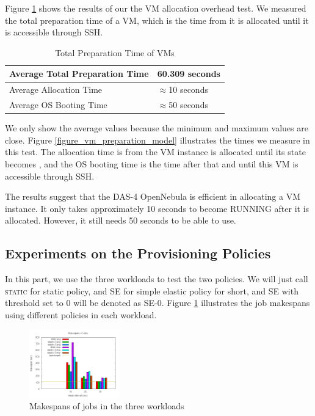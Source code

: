Figure \ref{table_vm_preparation} shows the results of our the VM allocation
overhead test. We measured the total preparation time of a VM, which is the
time from it is allocated until it is accessible through \textsc{SSH}.

\begin{table}
\caption{Total Preparation Time of VMs}
\label{table_vm_preparation}
\centering
\begin{tabular}{|l|l|}
\hline
Average Total Preparation Time & 60.309 seconds \\
\hline
Average Allocation Time & $\approx$10 seconds \\
\hline
Average OS Booting Time & $\approx$50 seconds \\
\hline
\end{tabular}
\end{table}

We only show the average values because the minimum and maximum values
are close. Figure \ref{figure_vm_preparation_model} illustrates the times
we measure in this test. The allocation time is from the VM instance is
allocated until its state becomes \staterunning, and the OS booting time is
the time after that and until this VM is accessible through \textsc{SSH}.

The results suggest that the DAS-4 OpenNebula is efficient in
allocating a VM instance. It only takes approximately 10 seconds to
become RUNNING after it is allocated. However, it still needs 50
seconds to be able to use.


\subsection{Experiments on the Provisioning Policies}
In this part, we use the three workloads to test the two policies. We
will just call \textsc{static} for static policy, and \textsc{SE} for
simple elastic policy for short, and \textsc{SE} with threshold set to
0 will be denoted as \textsc{SE-0}. Figure \ref{figure_jobmakespan}
illustrates the job makespans using different policies in each workload.

\begin{figure}[!t]
\centering
\includegraphics[width=0.35\textwidth]{pictures/all-makespans.png}
\caption{Makespans of jobs in the three workloads}
\label{figure_jobmakespan}
\end{figure}

